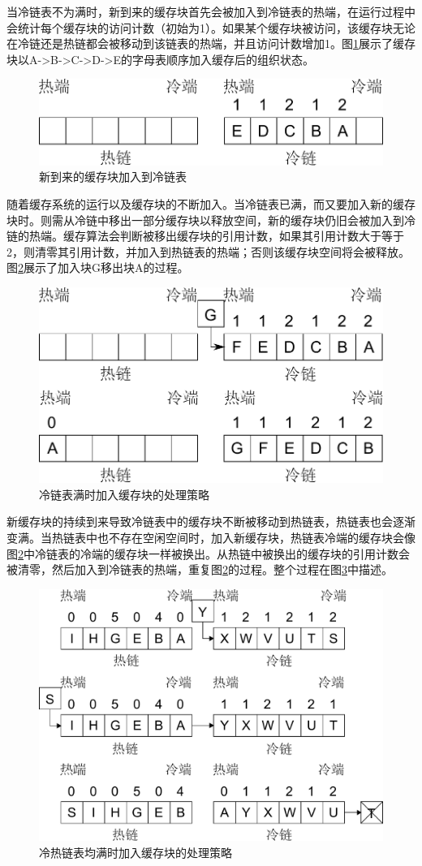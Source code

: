 当冷链表不为满时，新到来的缓存块首先会被加入到冷链表的热端，在运行过程中会统计每个缓存块的访问计数（初始为1）。如果某个缓存块被访问，该缓存块无论在冷链还是热链都会被移动到该链表的热端，并且访问计数增加1。图\ref{fig:replace-algo-2}展示了缓存块以A->B->C->D->E的字母表顺序加入缓存后的组织状态。
\begin{figure}[!htb]
\centering
\includegraphics[width=0.6\linewidth]{./graph/replace-algo-2}
\caption{新到来的缓存块加入到冷链表}
\label{fig:replace-algo-2}
\end{figure}

随着缓存系统的运行以及缓存块的不断加入。当冷链表已满，而又要加入新的缓存块时。则需从冷链中移出一部分缓存块以释放空间，新的缓存块仍旧会被加入到冷链的热端。缓存算法会判断被移出缓存块的引用计数，如果其引用计数大于等于2，则清零其引用计数，并加入到热链表的热端；否则该缓存块空间将会被释放。图\ref{fig:replace-algo-3}展示了加入块G移出块A的过程。
\begin{figure}[!htb]
\centering
\includegraphics[width=0.6\linewidth]{./graph/replace-algo-3}
\caption{冷链表满时加入缓存块的处理策略}
\label{fig:replace-algo-3}
\end{figure}

新缓存块的持续到来导致冷链表中的缓存块不断被移动到热链表，热链表也会逐渐变满。当热链表中也不存在空闲空间时，加入新缓存块，热链表冷端的缓存块会像图\ref{fig:replace-algo-3}中冷链表的冷端的缓存块一样被换出。从热链中被换出的缓存块的引用计数会被清零，然后加入到冷链表的热端，重复图\ref{fig:replace-algo-3}的过程。整个过程在图\ref{fig:replace-algo-4}中描述。
\begin{figure}[!htb]
\centering
\includegraphics[width=0.7\linewidth]{./graph/replace-algo-4}
\caption{冷热链表均满时加入缓存块的处理策略}
\label{fig:replace-algo-4}
\end{figure}

